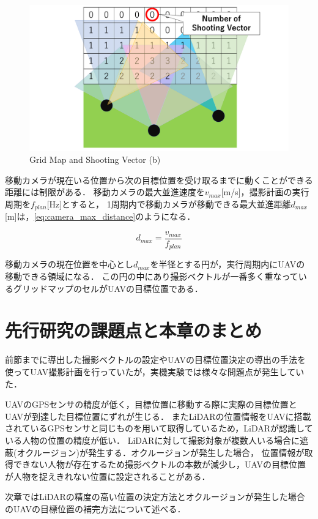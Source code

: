 \documentclass[autodetect-engine,dvipdfmx-if-dvi,ja=standard,a4j,jbase=11pt,magstyle=nomag*]{bxjsreport}
\begin{document}
\begin{figure}[p]
    \centering
    \includegraphics[width=\linewidth, clip]{./figure/chapter2/NSV_2.png}
    \caption{Grid Map and Shooting Vector (b)}
    \label{fig:nsv2}
\end{figure}

\newpage
移動カメラが現在いる位置から次の目標位置を受け取るまでに動くことができる距離には制限がある．
移動カメラの最大並進速度を$v_{max}$[m/s]，撮影計画の実行周期を$f_{plan}$[Hz]とすると，
1周期内で移動カメラが移動できる最大並進距離$d_{max}$[m]は，\cref{eq:camera_max_distance}のようになる．

\begin{equation}
d_{max} = \frac{v_{max}}{f_{plan}}
\label{eq:camera_max_distance}
\end{equation}

移動カメラの現在位置を中心とし$d_{max}$を半径とする円が，実行周期内にUAVの移動できる領域になる．
この円の中にあり撮影ベクトルが一番多く重なっているグリッドマップのセルがUAVの目標位置である．

\section{先行研究の課題点と本章のまとめ}
前節までに導出した撮影ベクトルの設定やUAVの目標位置決定の導出の手法を使ってUAV撮影計画を行っていたが，実機実験では様々な問題点が発生していた．

UAVのGPSセンサの精度が低く，目標位置に移動する際に実際の目標位置とUAVが到達した目標位置にずれが生じる．
またLiDARの位置情報をUAVに搭載されているGPSセンサと同じものを用いて取得しているため，LiDARが認識している人物の位置の精度が低い．
LiDARに対して撮影対象が複数人いる場合に遮蔽(オクルージョン)が発生する．オクルージョンが発生した場合，
位置情報が取得できない人物が存在するため撮影ベクトルの本数が減少し，UAVの目標位置が人物を捉えきれない位置に設定されることがある．

次章ではLiDARの精度の高い位置の決定方法とオクルージョンが発生した場合のUAVの目標位置の補完方法について述べる．
\end{document}
